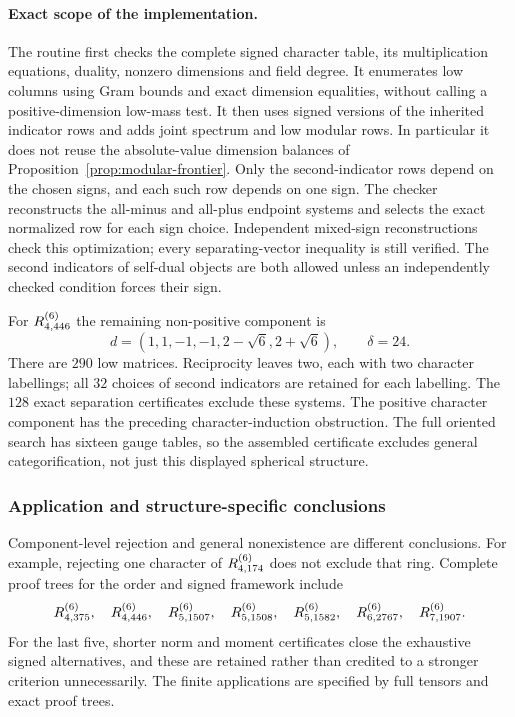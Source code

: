 \paragraph{Exact scope of the implementation.}
The routine first checks the complete signed character table, its
multiplication equations, duality, nonzero dimensions and field degree.
It enumerates low columns using Gram bounds and exact dimension
equalities, without calling a positive-dimension low-mass test. It then
uses signed versions of the inherited indicator rows and adds joint
spectrum and low modular rows. In particular it does not reuse the
absolute-value dimension balances of
Proposition~\ref{prop:modular-frontier}. Only the second-indicator rows depend on the chosen signs, and each such row depends on one sign. The checker reconstructs the all-minus and all-plus endpoint systems and selects the exact normalized row for each sign choice. Independent mixed-sign reconstructions check this optimization; every separating-vector inequality is still verified. The second indicators of
self-dual objects are both allowed unless an independently checked
condition forces their sign.

For $R^{(6)}_{4,446}$ the remaining non-positive component is
\[
 d=(1,1,-1,-1,2-\sqrt6,2+\sqrt6),\qquad\delta=24.
\]
There are $290$ low matrices. Reciprocity leaves two, each with two
character labellings; all $32$ choices of second indicators are retained
for each labelling. The $128$ exact separation certificates exclude
these systems. The positive character component has the preceding
character-induction obstruction. The full oriented search has sixteen
gauge tables, so the assembled certificate excludes general
categorification, not just this displayed spherical structure.

\subsubsection{Application and structure-specific conclusions}
Component-level rejection and general nonexistence are different
conclusions. For example, rejecting one character of $R^{(6)}_{4,174}$ does
not exclude that ring. Complete proof trees for the order and signed
framework include
\[
 R^{(6)}_{4,375},\quad R^{(6)}_{4,446},\quad
 R^{(6)}_{5,1507},\quad R^{(6)}_{5,1508},\quad R^{(6)}_{5,1582},\quad
 R^{(6)}_{6,2767},\quad R^{(6)}_{7,1907}.
\]
For the last five, shorter norm and moment certificates close the
exhaustive signed alternatives, and these are retained rather than
credited to a stronger criterion unnecessarily. The finite applications
are specified by full tensors and exact proof trees.

